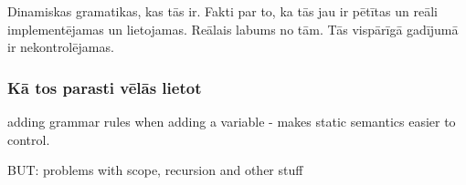Dinamiskas gramatikas, kas tās ir. Fakti par to, ka tās jau ir pētītas un reāli implementējamas un lietojamas. Reālais labums no tām.
 Tās vispārīgā gadījumā ir nekontrolējamas.

\subsubsection{Kā tos parasti vēlās lietot}
adding grammar rules when adding a variable - makes static semantics easier to control.

BUT: problems with scope, recursion and other stuff \cite{Christiansen:SurveyAdaptableGrammars}